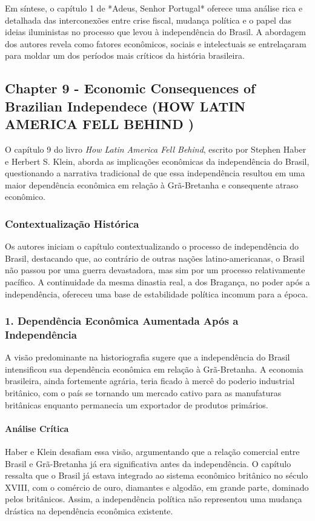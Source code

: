 \documentclass[a4paper,12pt]{article}[abntex2]
\begin{document}
Em síntese, o capítulo 1 de *Adeus, Senhor Portugal* oferece uma análise rica e detalhada das interconexões entre crise fiscal, mudança política e o papel das ideias iluministas no processo que levou à independência do Brasil. A abordagem dos autores revela como fatores econômicos, sociais e intelectuais se entrelaçaram para moldar um dos períodos mais críticos da história brasileira.

\newpage
\subsection{\textbf{Chapter 9 - Economic Consequences of Brazilian Independece (HOW LATIN AMERICA FELL BEHIND )}}

O capítulo 9 do livro \textit{How Latin America Fell Behind}, escrito por Stephen Haber e Herbert S. Klein, aborda as implicações econômicas da independência do Brasil, questionando a narrativa tradicional de que essa independência resultou em uma maior dependência econômica em relação à Grã-Bretanha e consequente atraso econômico.

\subsubsection*{Contextualização Histórica}
Os autores iniciam o capítulo contextualizando o processo de independência do Brasil, destacando que, ao contrário de outras nações latino-americanas, o Brasil não passou por uma guerra devastadora, mas sim por um processo relativamente pacífico. A continuidade da mesma dinastia real, a dos Bragança, no poder após a independência, ofereceu uma base de estabilidade política incomum para a época.

\subsubsection*{1. Dependência Econômica Aumentada Após a Independência}
A visão predominante na historiografia sugere que a independência do Brasil intensificou sua dependência econômica em relação à Grã-Bretanha. A economia brasileira, ainda fortemente agrária, teria ficado à mercê do poderio industrial britânico, com o país se tornando um mercado cativo para as manufaturas britânicas enquanto permanecia um exportador de produtos primários.

\paragraph*{Análise Crítica}
Haber e Klein desafiam essa visão, argumentando que a relação comercial entre Brasil e Grã-Bretanha já era significativa antes da independência. O capítulo ressalta que o Brasil já estava integrado ao sistema econômico britânico no século XVIII, com o comércio de ouro, diamantes e algodão, em grande parte, dominado pelos britânicos. Assim, a independência política não representou uma mudança drástica na dependência econômica existente.
\end{document}
